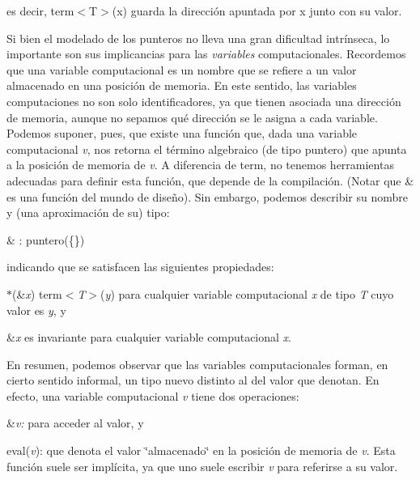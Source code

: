 es decir, term$<$\+T$>$(x) guarda la dirección apuntada por x junto con su valor.

Si bien el modelado de los punteros no lleva una gran dificultad intrínseca, lo importante son sus implicancias para las {\itshape variables} computacionales. Recordemos que una variable computacional es un nombre que se refiere a un valor almacenado en una posición de memoria. En este sentido, las variables computaciones no son solo identificadores, ya que tienen asociada una dirección de memoria, aunque no sepamos qué dirección se le asigna a cada variable. Podemos suponer, pues, que existe una función que, dada una variable computacional {\itshape v}, nos retorna el término algebraico (de tipo puntero) que apunta a la posición de memoria de {\itshape v}. A diferencia de term, no tenemos herramientas adecuadas para definir esta función, que depende de la compilación. (Notar que \& es una función del mundo de diseño). Sin embargo, podemos describir su nombre y (una aproximación de su) tipo\+:
\begin{DoxyItemize}
\item \& \+:   puntero(\{\})
\end{DoxyItemize}

indicando que se satisfacen las siguientes propiedades\+:
\begin{DoxyEnumerate}
\item $\ast$(\&{\itshape x})  term$<${\itshape T$>$}({\itshape y}) para cualquier variable computacional {\itshape x} de tipo {\itshape T} cuyo valor es {\itshape y}, y
\item \&{\itshape x} es invariante para cualquier variable computacional {\itshape x}.
\end{DoxyEnumerate}

En resumen, podemos observar que las variables computacionales forman, en cierto sentido informal, un tipo nuevo distinto al del valor que denotan. En efecto, una variable computacional {\itshape v} tiene dos operaciones\+:
\begin{DoxyEnumerate}
\item \&{\itshape v\+:} para acceder al valor, y
\item eval({\itshape v})\+: que denota el valor \char`\"{}almacenado\char`\"{} en la posición de memoria de {\itshape v}. Esta función suele ser implícita, ya que uno suele escribir {\itshape v} para referirse a su valor.
\end{DoxyEnumerate}


